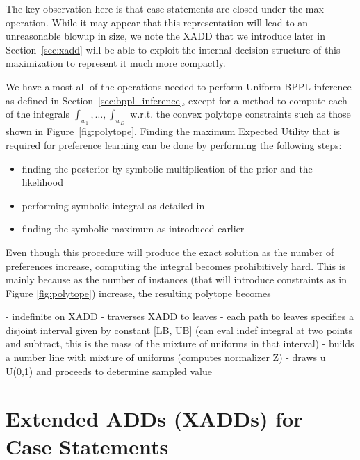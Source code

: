 \documentclass[letterpaper]{article}
\begin{document}
The key observation here is that case statements are closed under the
max operation.  While it may appear that this representation will lead
to an unreasonable blowup in size, we note the XADD that we introduce
later in Section~\ref{sec:xadd} will be able to exploit the internal
decision structure of this maximization to represent it much more
compactly.

We have almost all of the operations needed to perform Uniform BPPL
inference as defined in Section~\ref{sec:bppl_inference}, except for a
method to compute each of the integrals $\int_{w_1},\ldots,\int_{w_D}$
w.r.t. the convex polytope constraints such as those shown in
Figure~\ref{fig:polytope}. Finding the maximum Expected Utility 
that is required for preference learning can be done by performing the following steps:
\begin{itemize}
\item finding the posterior by symbolic multiplication of the prior and the likelihood
\item performing symbolic integral as detailed in \cite{sve11}
\item finding the symbolic maximum as introduced earlier
\end{itemize}
Even though this procedure will produce the exact solution as the number 
of preferences increase, computing the integral becomes prohibitively hard. 
This is mainly because as the number of instances (that will introduce constraints as
in Figure \ref{fig:polytope}) increase, the resulting polytope becomes 

- indefinite on XADD
- traverses XADD to leaves
- each path to leaves specifies a disjoint interval given by constant [LB, UB] 
  (can eval indef integral at two points and subtract, this is the mass of the mixture of uniforms in that interval)
- builds a number line with mixture of uniforms (computes normalizer Z)
- draws u ~ U(0,1) and proceeds to determine sampled value




\section{Extended ADDs (XADDs) for Case Statements}
\end{document}
